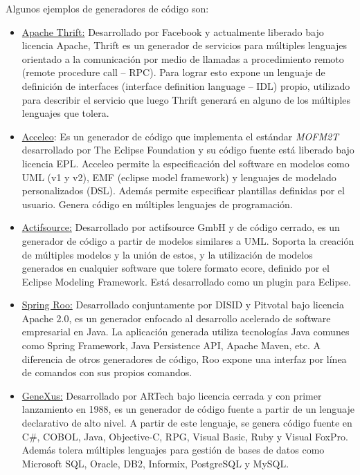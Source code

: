 Algunos ejemplos de generadores de código son:
\begin{itemize}
  \item \underline{Apache Thrift:} Desarrollado por Facebook y actualmente
  liberado bajo licencia Apache, Thrift es un generador de servicios para múltiples lenguajes
  orientado a la comunicación por medio de llamadas a procedimiento remoto
  (remote procedure call – RPC). Para lograr esto expone un lenguaje de
  definición de interfaces (interface definition language – IDL) propio,
  utilizado para describir el servicio que luego Thrift generará en alguno de
  los múltiples lenguajes que tolera.
  \item \underline{Acceleo}: Es un generador de código que implementa el
  estándar \textit{MOFM2T} desarrollado por The Eclipse Foundation y su código fuente
  está liberado bajo licencia EPL. Acceleo permite la especificación del
  software en modelos como UML (v1 y v2), EMF (eclipse model framework) y
  lenguajes de modelado personalizados (DSL). Además permite especificar
  plantillas definidas por el usuario. Genera código en múltiples lenguajes de
  programación.
  \item \underline{Actifsource:} Desarrollado por actifsource GmbH y de código
  cerrado, es un generador de código a partir de modelos similares a UML. Soporta la
  creación de múltiples modelos y la unión de estos, y la utilización de modelos
  generados en cualquier software que tolere formato ecore, definido por el
  Eclipse Modeling Framework. Está desarrollado como un plugin para Eclipse.
  \item \underline{Spring Roo:} Desarrollado conjuntamente por DISID y Pitvotal
  bajo licencia Apache 2.0, es un generador enfocado al desarrollo acelerado de
  software empresarial en Java. La aplicación generada utiliza tecnologías Java
  comunes como Spring Framework, Java Persistence API, Apache Maven, etc. A
  diferencia de otros generadores de código, Roo expone una interfaz por línea
  de comandos con sus propios comandos.
  \item \underline{GeneXus:} Desarrollado por ARTech bajo licencia cerrada y con
  primer lanzamiento en 1988, es un generador de código fuente a partir de un
  lenguaje declarativo de alto nivel. A partir de este lenguaje, se genera
  código fuente en C\#, COBOL, Java, Objective-C, RPG, Visual Basic,
  Ruby y Visual FoxPro. Además tolera múltiples lenguajes para gestión de bases de
  datos como Microsoft SQL, Oracle, DB2, Informix, PostgreSQL y MySQL.
  \end{itemize}
